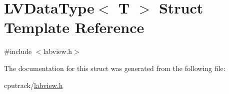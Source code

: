 \hypertarget{struct_l_v_data_type}{}\section{L\+V\+Data\+Type$<$ T $>$ Struct Template Reference}
\label{struct_l_v_data_type}


{\ttfamily \#include $<$labview.\+h$>$}



The documentation for this struct was generated from the following file\+:\begin{DoxyCompactItemize}
\item 
cputrack/\hyperlink{labview_8h}{labview.\+h}\end{DoxyCompactItemize}
